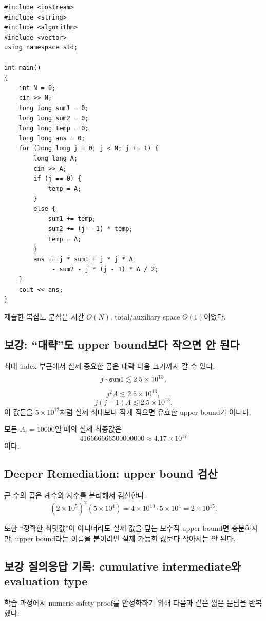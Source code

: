 \begin{answerbox}[학습자 제출 답안]
\begin{lstlisting}
#include <iostream>
#include <string>
#include <algorithm>
#include <vector>
using namespace std;

int main()
{
    int N = 0;
    cin >> N;
    long long sum1 = 0;
    long long sum2 = 0;
    long long temp = 0;
    long long ans = 0;
    for (long long j = 0; j < N; j += 1) {
        long long A;
        cin >> A;
        if (j == 0) {
            temp = A;
        }
        else {
            sum1 += temp;
            sum2 += (j - 1) * temp;
            temp = A;
        }
        ans += j * sum1 + j * j * A
             - sum2 - j * (j - 1) * A / 2;
    }
    cout << ans;
}
\end{lstlisting}

제출한 복잡도 분석은 시간 $O(N)$, total/auxiliary space $O(1)$이었다.
\end{answerbox}

\subsection{보강: ``대략''도 upper bound보다 작으면 안 된다}
최대 index 부근에서 실제 중요한 곱은 대략 다음 크기까지 갈 수 있다.
\[
j\cdot\texttt{sum1}\lesssim2.5\times10^{13},
\]
\[
j^2A\lesssim2.5\times10^{13},
\]
\[
j(j-1)A\lesssim2.5\times10^{13}.
\]
이 값들을 $5\times10^{12}$처럼 실제 최대보다 작게 적으면 유효한 upper bound가 아니다.

모든 $A_i=10000$일 때의 실제 최종값은
\[
416666666500000000\approx4.17\times10^{17}
\]
이다.

\subsection{Deeper Remediation: upper bound 검산}
큰 수의 곱은 계수와 지수를 분리해서 검산한다.
\[
(2\times10^5)^2(5\times10^4)
=4\times10^{10}\cdot5\times10^4
=2\times10^{15}.
\]

또한 ``정확한 최댓값''이 아니더라도 실제 값을 덮는 보수적 upper bound면 충분하지만, upper bound라는 이름을 붙이려면 실제 가능한 값보다 작아서는 안 된다.


\subsection{보강 질의응답 기록: cumulative intermediate와 evaluation type}
학습 과정에서 numeric-safety proof를 안정화하기 위해 다음과 같은 짧은 문답을 반복했다.

